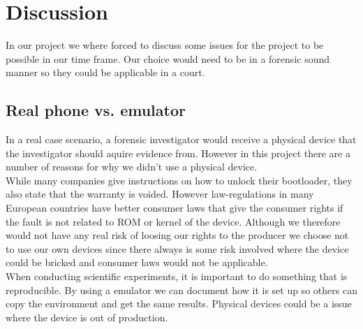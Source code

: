 \section{Discussion}
In our project we where forced to discuss some issues for the project to be 
possible in our time frame. Our choice would need to be in a forensic sound manner 
so they could be applicable in a court. 

\subsection{Real phone vs. emulator}
In a real case scenario, a forensic investigator would receive a physical device 
that the investigator should aquire evidence from. However in this project there 
are a number of reasons for why we didn't use a physical device.\\

While many companies give instructions on how to unlock their bootloader, they also 
state that the warranty is voided. However law-regulations in many European countries 
have better consumer laws that give the consumer rights if the fault %
is not related to ROM or kernel of the device. Although we therefore would not have 
any real risk of loosing our rights to the producer we choose not to use our own 
devices since there always is some risk involved where the device could be bricked 
and consumer laws would not be applicable.\\

When conducting scientific experiments, it is important to do something that is 
reproducible. By using a emulator we can document how it is set up so others can 
copy the environment and get the same results. Physical devices could be a issue 
where the device is out of production.

